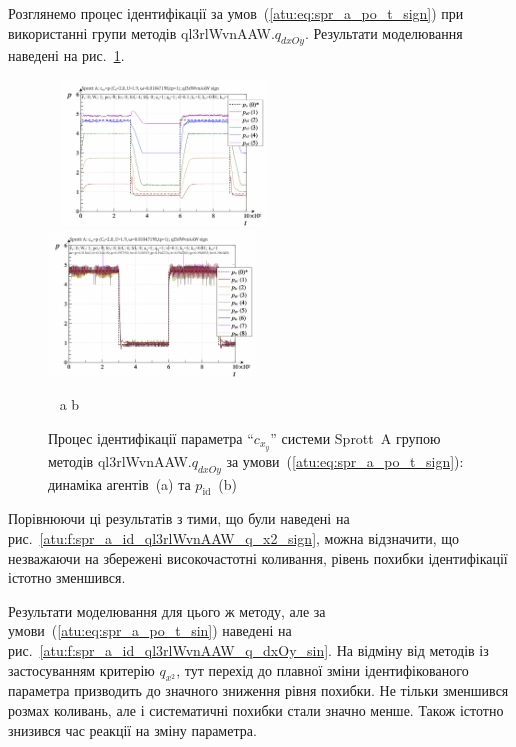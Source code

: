 Розглянемо процес ідентифікації за умов~(\ref{atu:eq:spr_a_po_t_sign}) при
використанні групи методів ql3rlWvnAAW.$q_{dxOy}$. Результати моделювання наведені на
рис.~\ref{atu:f:spr_a_id_ql3rlWvnAAW_q_dxOy_sign}.

\begin{figure}[htb!]
\begin{center}
  ~ \hfill
    \includegraphics[width=0.49\textwidth]{p/cha/spr_a/ql3rlWvnAAW_dxOy/sprott_a_id2-p_t_pi_ql3rlWvnAAW_sign.png}
    \hfill
    \includegraphics[width=0.49\textwidth]{p/cha/spr_a/ql3rlWvnAAW_dxOy/sprott_a_id2-p_t_p_ql3rlWvnAAW_sign.png}
  \hfill ~
\end{center}
  \vspace{-1.0ex}
  \begin{center}
    ~ \hfill a \hfill\hfill b \hfill ~
  \end{center}
  \caption{Процес ідентифікації параметра ``$c_{x_y}$'' системи Sprott~A групою методів ql3rlWvnAAW.$q_{dxOy}$ за умови~(\ref{atu:eq:spr_a_po_t_sign}): динаміка агентів~(a) та $p_\mathrm{id}$~(b)}
  \label{atu:f:spr_a_id_ql3rlWvnAAW_q_dxOy_sign}
\end{figure}

Порівнюючи ці результатів з тими, що були наведені на
рис.~\ref{atu:f:spr_a_id_ql3rlWvnAAW_q_x2_sign}, можна відзначити, що незважаючи
на збережені високочастотні коливання, рівень похибки
ідентифікації істотно зменшився.

Результати моделювання для цього ж методу,
але за умови~(\ref{atu:eq:spr_a_po_t_sin}) наведені на
рис.~\ref{atu:f:spr_a_id_ql3rlWvnAAW_q_dxOy_sin}. На відміну від методів із
застосуванням критерію
$q_{x^2}$, тут перехід до плавної зміни ідентифікованого
параметра призводить до значного зниження рівня похибки. Не
тільки зменшився розмах коливань, але і систематичні похибки
стали значно менше. Також істотно знизився час реакції на
зміну параметра.

